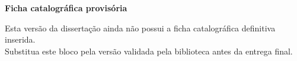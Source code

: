 \begin{fichacatalografica}

\vspace*{\fill}
\begin{center}
  \textbf{Ficha catalográfica provisória}

  \vspace{1em}
  Esta versão da dissertação ainda não possui a ficha catalográfica definitiva inserida.
  \\
  Substitua este bloco pela versão validada pela biblioteca antes da entrega final.
\end{center}
\vspace*{\fill}

\end{fichacatalografica}
